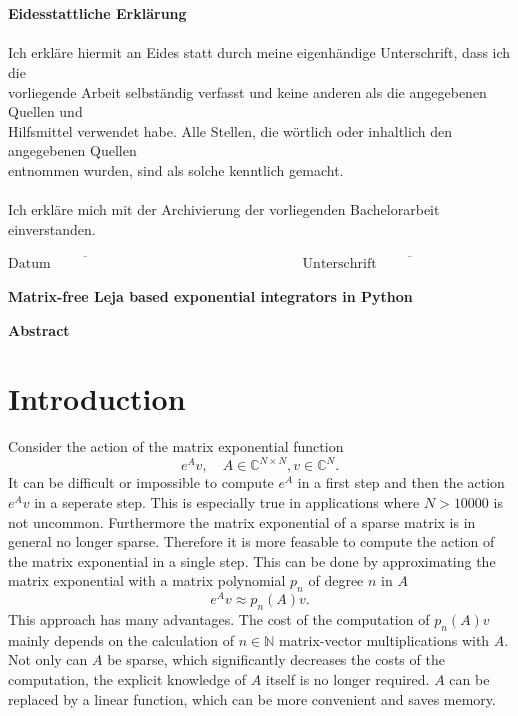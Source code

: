 \documentclass{scrartcl}
\begin{document}
{\begin{figure}[!htp]
\begin{flushright}
\end{flushright}
\end{figure}\\\\
{\Large\textbf{Eidesstattliche Erklärung}}\\\\
Ich erkläre hiermit an Eides statt durch meine eigenhändige Unterschrift, dass ich die\\ vorliegende Arbeit selbständig verfasst und keine anderen als die angegebenen Quellen und\\ Hilfsmittel verwendet habe. Alle Stellen, die wörtlich oder inhaltlich den angegebenen Quellen \\entnommen wurden, sind als solche kenntlich gemacht.\\\\
Ich erkläre mich mit der Archivierung der vorliegenden Bachelorarbeit einverstanden.
\vspace{40pt}\\
\begin{center}
\ensuremath{\overline{\mbox{Datum}\hspace{8em}}
    \hspace{10em}
    \overline{\mbox{Unterschrift}\hspace{10em}}
}
\thispagestyle{empty}
\end{center}}
\pagebreak



\begin{center}\textbf{\Huge Matrix-free Leja based exponential integrators in Python}\end{center}
\begin{center}\textbf{Abstract}\end{center}
\begin{abstract}

\end{abstract}

\setcounter{page}{1}

\section{Introduction}
Consider the action of the matrix exponential function 
	\[e^Av,\quad A\in\mathbb{C}^{N\times N}, v\in\mathbb{C}^N.\] 
It can be difficult or impossible to compute $e^A$ in a first step and then the action $e^Av$ in a seperate step. This is especially true in applications where $N>10000$ is not uncommon. Furthermore the matrix exponential of a sparse matrix is in general no longer sparse. Therefore it is more feasable to compute the action of the matrix exponential in a single step. This can be done by approximating the matrix exponential with a matrix polynomial $p_n$ of degree $n$ in $A$
	\[e^Av \approx p_n(A)v.\]
This approach has many advantages. The cost of the computation of $p_n(A)v$ mainly depends on the calculation of $n\in\mathbb{N}$ matrix-vector multiplications with $A$. Not only can $A$ be sparse, which significantly decreases the costs of the computation, the explicit knowledge of $A$ itself is no longer required. $A$ can be replaced by a linear function, which can be more convenient and saves memory.
\end{document}
